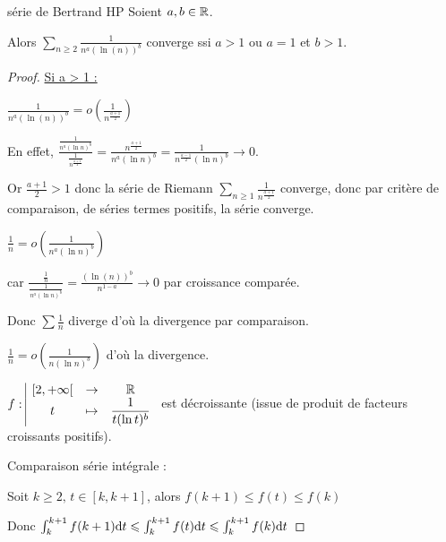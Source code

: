 \begin{proposition}{série de Bertrand HP}{}
    Soient $a, b \in \mathbb{R}$. 

    Alors $\displaystyle \sum_{n \geqslant 2} \frac 1 {n^a(\ln(n))^b}$ converge ssi $a > 1$ ou $a = 1$ et $b > 1$.

\end{proposition}


\begin{proof}
    \uline{Si a > 1 :}

    \svspace $\displaystyle \frac 1 {n^a(\ln(n))^b} = o \left( \frac 1 {n^{\frac{a + 1} 2}} \right)$

    En effet, $\displaystyle \frac{\frac 1 {n^a (\ln n)^b}}{\frac 1 {n^{\frac{a + 1} 2}}} = \frac{n^{\frac{a + 1} 2}}{n^a(\ln n)^b} = \frac{1}{n^{\frac{a - 1} 2}(\ln n)^b} \longrightarrow 0$.

    Or $\frac{a + 1} 2 > 1 $ donc la série de Riemann $\sum_{n \geqslant 1 } \frac 1 {n^{\frac{a + 1} 2}}$ converge, donc par critère de comparaison,
    de séries termes positifs, la série converge. 



    \svspace $\displaystyle \frac 1 n = o \left( \frac{1 }{n^a (\ln n)^b} \right)$

     car $\displaystyle \frac{\frac 1 n}{\frac 1 {n^a (\ln n)^b}} = \frac{(\ln(n))^b }{n^{1 - a}} \longrightarrow 0$ par croissance comparée.

     Donc $\sum \frac 1 n $ diverge d'où la divergence par comparaison. 


     \svspace $ \frac 1 n = o \left( \frac 1 {n (\ln n)^b} \right)$ d'où la divergence. 


    \svspace $f: \space \begin{array}{|ccc} \displaystyle [2, + \infty[ & \to & \displaystyle \mathbb{R} \\ \displaystyle t & \mapsto & \displaystyle \frac 1 {t (\ln t)^b} \end{array}$ est décroissante (issue de produit
    de facteurs croissants positifs). 

    Comparaison série intégrale : 

    Soit $k \geqslant 2, \, t \in [k, k + 1]$, alors $f(k + 1) \leqslant f(t) \leqslant f(k)$

    Donc $\int_{k}^{k + 1} f(k + 1) \text d t \leqslant \int_{k}^{k + 1} f(t) \text d t \leqslant \int_{k}^{k + 1} f(k) \text d t$


\end{proof}
